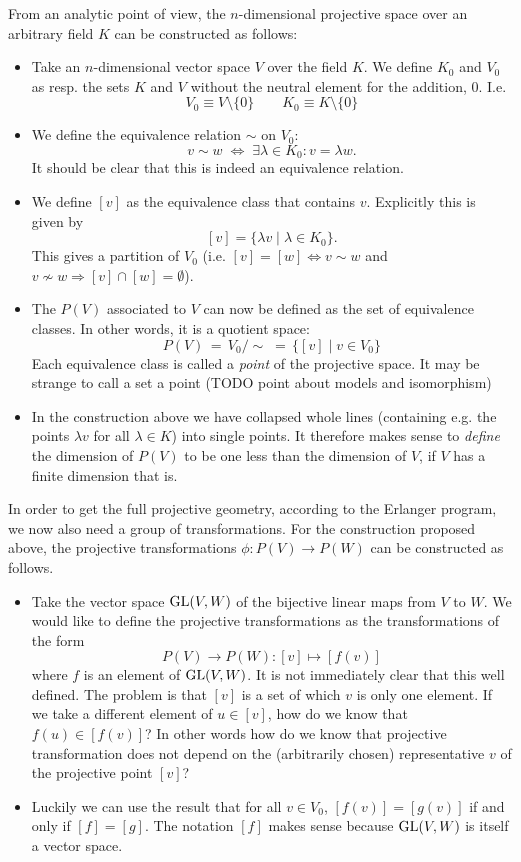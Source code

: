 From an analytic point of view, the $n$-dimensional projective space over an arbitrary field $K$ can be constructed as follows:
\begin{itemize}
\item Take an $n$-dimensional vector space $V$ over the field $K$. We define $K_0$ and $V_0$ as resp. the sets $K$ and $V$ without the neutral element for the addition, $0$. I.e.
\[ V_0 \equiv V\setminus \{0\} \qquad K_0 \equiv K\setminus \{0\} \]
\item We define the equivalence relation $\sim$ on $V_0$:
\[ v \sim w \;\Leftrightarrow\; \exists \lambda \in K_0: v = \lambda w. \]
It should be clear that this is indeed an equivalence relation.
\item We define $[v]$ as the equivalence class that contains $v$. Explicitly this is given by
\[ [v] = \{ \lambda v \; |\; \lambda \in K_0 \}. \]
This gives a partition of $V_0$ (i.e. $[v] = [w] \Leftrightarrow v\sim w$ and $v \nsim w \Rightarrow [v] \cap [w] = \emptyset$).
\item The  $P(V)$ associated to $V$ can now be defined as the set of equivalence classes. In other words, it is a quotient space:
\[ P(V) \, = \,V_0 / \sim\; =  \,\{ [v] \;|\; v \in V_0 \}  \]
Each equivalence class is called a \textit{point} of the projective space. It may be strange to call a set a point (TODO point about models and isomorphism)
\item In the construction above we have collapsed whole lines (containing e.g. the points $\lambda v$ for all $\lambda \in K$) into single points. It therefore makes sense to \textit{define} the dimension of $P(V)$ to be one less than the dimension of $V$, if $V$ has a finite dimension that is.
\end{itemize}
In order to get the full projective geometry, according to the Erlanger program, we now also need a group of transformations. For the construction proposed above, the projective transformations $\phi: P(V) \to P(W)$ can be constructed as follows.
\begin{itemize}
\item Take the vector space $\operatorname{GL}(V,W)$ of the bijective linear maps from $V$ to $W$. We would like to define the projective transformations as the transformations of the form
\[ P(V) \to P(W): [v] \mapsto [f(v)] \]
where $f$ is an element of $\operatorname{GL}(V,W)$. It is not immediately clear that this well defined. The problem is that $[v]$ is a set of which $v$ is only one element. If we take a different element of $u \in [v]$, how do we know that $f(u) \in [f(v)]$? In other words how do we know that projective transformation does not depend on the (arbitrarily chosen) representative $v$ of the projective point $[v]$?
\item Luckily we can use the result that for all $v\in V_0$, $[f(v)] = [g(v)]$ if and only if $[f] = [g]$. The notation $[f]$ makes sense because $\operatorname{GL}(V,W)$ is itself a vector space.
\end{itemize}


